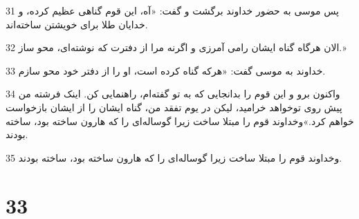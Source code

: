\par 31 پس موسی به حضور خداوند برگشت و گفت: «آه، این قوم گناهی عظیم کرده، و خدایان طلا برای خویشتن ساخته‌اند.
\par 32 الان هرگاه گناه ایشان رامی آمرزی و اگرنه مرا از دفترت که نوشته‌ای، محو ساز.»
\par 33 خداوند به موسی گفت: «هر‌که گناه کرده است، او را از دفتر خود محو سازم.
\par 34 واکنون برو و این قوم را بدانجایی که به تو گفته‌ام، راهنمایی کن. اینک فرشته من پیش روی توخواهد خرامید، لیکن در یوم تفقد من، گناه ایشان را از ایشان بازخواست خواهم کرد.»وخداوند قوم را مبتلا ساخت زیرا گوساله‌ای را که هارون ساخته بود، ساخته بودند.
\par 35 وخداوند قوم را مبتلا ساخت زیرا گوساله‌ای را که هارون ساخته بود، ساخته بودند.
 
\chapter{33}

